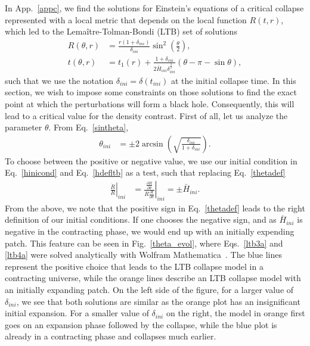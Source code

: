 \documentclass[a4paper,11pt]{article}
\begin{document}
In App.~\ref{appc}, we find the solutions for Einstein's equations of a critical
collapse represented with a local metric that depends on the local function $R(t,r)$,
which led to the Lemaître-Tolman-Bondi (LTB) set of solutions
\begin{align}
	\label{ltb3a}
	R(\theta, r) & = \frac{r (1+\delta_{ini})}{\delta_{ini}}\sin^2\left(\frac{\theta}{2}\right),                                        \\
	\label{ltb4a}
	t(\theta,r ) & = t_1(r) + \frac{1 + \delta_{ini}}{2\bar{H}_{ini}\delta^{\frac{3}{2}}_{ini}}\left(\theta - \pi - \sin \theta \right)
	,\end{align}
such that we use the notation $\delta_{ini} = \delta(t_{ini})$ at the initial collapse
time. In this section, we wish to impose some constraints on those solutions to find the
exact point at which the perturbations will form a black hole. Consequently, this will
lead to a critical value for the density contrast. First of all, let us analyze the
parameter $\theta$. From Eq.~\eqref{sintheta},
\begin{align}
	\label{thetadef}
	\theta_{ini} & = \pm 2\arcsin(\sqrt{\frac{\delta_{ini}}{1+\delta_{ini}}})
	.\end{align}
To choose between the positive or negative value, we use our initial condition in
Eq.~\eqref{hinicond} and Eq.~\eqref{hdefltb} as a test, such that replacing
Eq.~\eqref{thetadef}
\begin{align}
	\left.\frac{\dot{R}}{R}\right|_{ini} & =  \left.\frac{\frac{\partial R}{\partial \theta}}{R \frac{\partial t}{\partial \theta}}\right|_{ini} = \pm \bar{H}_{ini}.
\end{align}
From the above, we note that the positive sign in Eq.~\eqref{thetadef} leads to the
right definition of our initial conditions. If one chooses the negative sign, and as
$\bar{H}_{ini}$ is negative in the contracting phase, we would end up with an initially
expending patch. This feature can be seen in Fig.~\ref{theta_evol}, where
Eqs.~\eqref{ltb3a} and \eqref{ltb4a} were solved analytically with Wolfram
Mathematica~\cite{Mathematica}. The blue lines represent the positive choice that leads
to the LTB collapse model in a contracting universe, while the orange lines describe an
LTB collapse model with an initially expanding patch. On the left side of the figure,
for a larger value of $\delta_{ini}$, we see that both solutions are similar as the
orange plot has an insignificant initial expansion. For a smaller value of
$\delta_{ini}$ on the right, the model in orange first goes on an expansion phase
followed by the collapse, while the blue plot is already in a contracting phase and
collapses much earlier.
\end{document}
